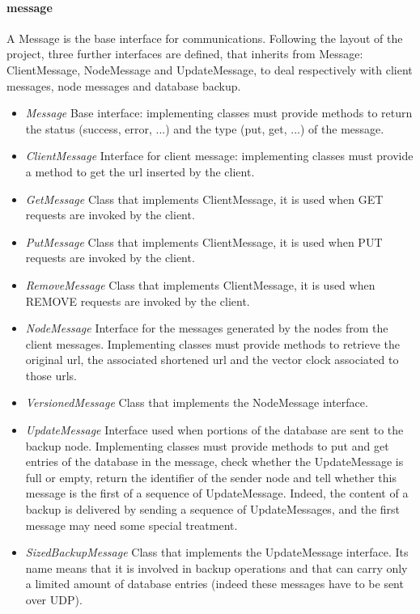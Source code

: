 \documentclass{article}
\begin{document}
\paragraph{message} A Message is the base interface for communications. Following the layout of the project, three further interfaces are defined, that inherits from Message: ClientMessage, NodeMessage and UpdateMessage, to deal respectively with client messages, node messages and database backup. 
\begin{itemize}
\item \textit{Message} Base interface: implementing classes must provide methods to return the status (success, error, ...) and the type (put, get, ...) of the message.
\item \textit{ClientMessage} Interface for client message: implementing classes must provide a method to get the url inserted by the client.
\item \textit{GetMessage} Class that implements ClientMessage, it is used when GET requests are invoked by the client.
\item \textit{PutMessage} Class that implements ClientMessage, it is used when PUT requests are invoked by the client.
\item \textit{RemoveMessage} Class that implements ClientMessage, it is used when REMOVE requests are invoked by the client.
\item \textit{NodeMessage} Interface for the messages generated by the nodes from the client messages. Implementing classes must provide methods to retrieve the original url, the associated shortened url and the vector clock associated to those urls.
\item \textit{VersionedMessage} Class that implements the NodeMessage interface.
\item \textit{UpdateMessage} Interface used when portions of the database are sent to the backup node. Implementing classes must provide methods to put and get entries of the database in the message, check whether the UpdateMessage is full or empty, return the identifier of the sender node and tell whether this message is the first of a sequence of UpdateMessage. Indeed, the content of a backup is delivered by sending a sequence of UpdateMessages, and the first message may need some special treatment.
\item \textit{SizedBackupMessage} Class that implements the UpdateMessage interface. Its name means that it is involved in backup operations and that can carry only a limited amount of database entries (indeed these messages have to be sent over UDP).
\end{itemize}
\end{document}
